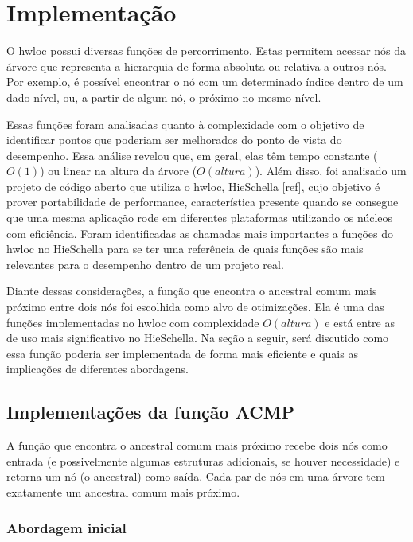 \chapter{Implementação}

O hwloc possui diversas funções de percorrimento.
Estas permitem acessar nós da árvore que representa a hierarquia de forma absoluta ou relativa a outros nós.
Por exemplo, é possível encontrar o nó com um determinado índice dentro de um dado nível,
ou, a partir de algum nó, o próximo no mesmo nível.

Essas funções foram analisadas quanto à complexidade com o objetivo de identificar pontos que poderiam ser melhorados do ponto de vista do desempenho.
Essa análise revelou que, em geral, elas têm tempo constante ($O(1)$) ou linear na altura da árvore ($O(altura)$).
Além disso, foi analisado um projeto de código aberto que utiliza o hwloc, HieSchella [ref],
cujo objetivo é prover portabilidade de performance, característica presente quando se consegue que
uma mesma aplicação rode em diferentes plataformas utilizando os núcleos com eficiência.
Foram identificadas as chamadas mais importantes a funções do hwloc no HieSchella para se ter uma referência
de quais funções são mais relevantes para o desempenho dentro de um projeto real.

Diante dessas considerações, a função que encontra o ancestral comum mais próximo entre dois nós foi escolhida como alvo de otimizações.
Ela é uma das funções implementadas no hwloc com complexidade $O(\mathit{altura})$ e está entre as de uso mais significativo no HieSchella.
Na seção a seguir, será discutido como essa função poderia ser implementada de forma mais eficiente e quais as implicações de diferentes abordagens.


\section{Implementações da função ACMP}

A função que encontra o ancestral comum mais próximo recebe dois nós como entrada (e possivelmente algumas estruturas adicionais, se houver necessidade)
e retorna um nó (o ancestral) como saída.
Cada par de nós em uma árvore tem exatamente um ancestral comum mais próximo.

\subsection{Abordagem inicial}

